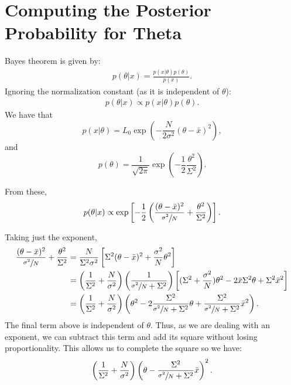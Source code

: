 \documentclass[a4paper,11pt,twoside]{article}
\begin{document}
\section{Computing the Posterior Probability for Theta}
\label{sec:posterior}
Bayes theorem is given by:
\begin{align*}
	p(\theta|x) = \frac{p(x|\theta)p(\theta)}{p(x)}.
\end{align*}
Ignoring the normalization constant (as it is independent of $\theta$):
\begin{align*}
	p(\theta|x) \propto p(x|\theta)p(\theta).
\end{align*}
We have that
\begin{equation*}
	p(x|\theta) = L_0 \exp \left( -\frac{N}{2 \sigma^2} (\theta - \bar{x})^2 \right),
\end{equation*}
and
\begin{equation*}
	p(\theta) =  \frac{1}{\sqrt{2\pi}}\exp\left(-\frac{1}{2}\frac{\theta^2}{\Sigma^2}\right).
\end{equation*}

From these,
\begin{equation*}
	p(\theta|x) \propto \exp \left[ -\frac{1}{2} \left( \frac{(\theta - \bar{x})^2}{\sfrac{\sigma^2}{N}} +\frac{\theta^2}{\Sigma^2} \right) \right].
\end{equation*}

Taking just the exponent,
\begin{align*}
	\frac{(\theta - \bar{x})^2}{\sfrac{\sigma^2}{N}} + \frac{\theta^2}{\Sigma^2} &= \frac{N}{\Sigma^2\sigma^2} \left[\Sigma^2 (\theta - \bar{x})^2 + \frac{\sigma^2}{N} \theta^2 \right]
	\\ &= \left( \frac{1}{\Sigma^2} + \frac{N}{\sigma^2} \right) \left( \frac{1}{\sfrac{\sigma^2}{N} + \Sigma^2} \right) \left[ (\Sigma^2 + \frac{\sigma^2}{N})\theta^2 - 2\bar{x}\Sigma^2\theta + \Sigma^2\bar{x}^2 \right]
	\\ &= \left( \frac{1}{\Sigma^2} + \frac{N}{\sigma^2} \right) \left( \theta^2 - 2 \frac{\Sigma^2}{\sfrac{\sigma^2}{N} + \Sigma^2} \theta + \frac{\Sigma^2}{\sfrac{\sigma^2}{N} + \Sigma^2} \bar{x}^2 \right).
\end{align*}
The final term above is independent of $\theta$. Thus, as we are dealing with an exponent, we can subtract this term and add its square without losing proportionality. This allows us to complete the square so we have:
\begin{equation*}
	\left( \frac{1}{\Sigma^2} + \frac{N}{\sigma^2} \right) \left( \theta - \frac{\Sigma^2}{\sfrac{\sigma^2}{N} + \Sigma^2} \bar{x} \right)^2.
\end{equation*}
\end{document}
